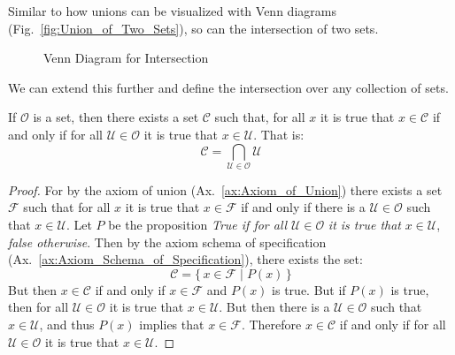         Similar to how unions can be visualized with Venn diagrams
        (Fig.~\ref{fig:Union_of_Two_Sets}), so can the intersection of
        two sets.
        \begin{figure}[H]
            \centering
            
            \caption{Venn Diagram for Intersection}
            \label{fig:Intersection_of_Two_Sets}
        \end{figure}
        We can extend this further and define the intersection over any
        collection of sets.
        \begin{theorem}
            \label{thm:Existence_of_Arbitrary_Intersetions}%
            If $\mathcal{O}$ is a set, then there exists a set
            $\mathcal{C}$ such that, for all $x$ it is true that
            $x\in\mathcal{C}$ if and only if for all
            $\mathcal{U}\in\mathcal{O}$ it is true that $x\in\mathcal{U}$.
            That is:
            \begin{equation}
                \mathcal{C}=\bigcap_{\mathcal{U}\in\mathcal{O}}\mathcal{U}
            \end{equation}
        \end{theorem}
        \begin{proof}
            For by the axiom of union (Ax.~\ref{ax:Axiom_of_Union}) there
            exists a set $\mathcal{F}$ such that for all $x$ it is true that
            $x\in\mathcal{F}$ if and only if there is a
            $\mathcal{U}\in\mathcal{O}$ such that $x\in\mathcal{U}$. Let
            $P$ be the proposition \textit{True if for all}
            $\mathcal{U}\in\mathcal{O}$ \textit{it is true that}
            $x\in\mathcal{U}$, \textit{false otherwise}. Then by the
            axiom schema of specification
            (Ax.~\ref{ax:Axiom_Schema_of_Specification}), there exists the
            set:
            \begin{equation}
                \mathcal{C}
                =\Big\{\,x\in\mathcal{F}\;|\;P(x)\,\Big\}
            \end{equation}
            But then $x\in\mathcal{C}$ if and only if $x\in\mathcal{F}$ and
            $P(x)$ is true. But if $P(x)$ is true, then for all
            $\mathcal{U}\in\mathcal{O}$ it is true that $x\in\mathcal{U}$. But
            then there is a $\mathcal{U}\in\mathcal{O}$ such that
            $x\in\mathcal{U}$, and thus $P(x)$ implies that $x\in\mathcal{F}$.
            Therefore $x\in\mathcal{C}$ if and only if for all
            $\mathcal{U}\in\mathcal{O}$ it is true that $x\in\mathcal{U}$.
        \end{proof}
